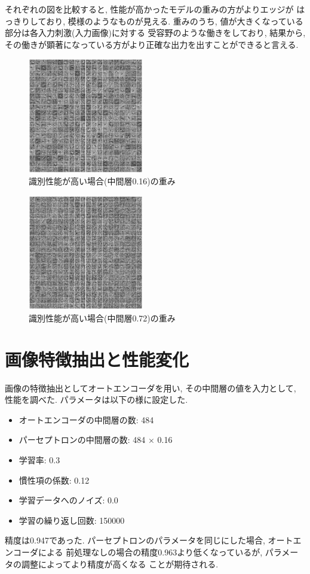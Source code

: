 \documentclass[10pt,a4paper,twocolumn]{jarticle}
\begin{document}
それぞれの図を比較すると, 性能が高かったモデルの重みの方がよりエッジが
はっきりしており, 模様のようなものが見える. 
重みのうち, 値が大きくなっている部分は各入力刺激(入力画像)に対する
受容野のような働きをしており, 結果から, 
その働きが顕著になっている方がより正確な出力を出すことができると言える. 
\begin{figure}[htbp] 
  \centering
  \includegraphics[width=0.45\textwidth]{assets/img/n_hidden_test_mnist_image_nsmpl150000_nh0.16.eps}
  \caption{識別性能が高い場合(中間層0.16)の重み}
  \label{fig:hidden-layer-analyze-img-0.16}
\end{figure}
\begin{figure}[htbp] 
  \centering
  \includegraphics[width=0.45\textwidth]{assets/img/n_hidden_test_mnist_image_nsmpl150000_nh0.72.eps}
  \caption{識別性能が高い場合(中間層0.72)の重み}
  \label{fig:hidden-layer-analyze-img-0.72}
\end{figure}
\section{画像特徴抽出と性能変化}\label{section:feature_test}
画像の特徴抽出としてオートエンコーダを用い, その中間層の値を入力として, 
性能を調べた. パラメータは以下の様に設定した. 
\begin{itemize}
  \item オートエンコーダの中間層の数: 484
  \item パーセプトロンの中間層の数: 484 × 0.16
  \item 学習率: 0.3
  \item 慣性項の係数: 0.12
  \item 学習データへのノイズ: 0.0
  \item 学習の繰り返し回数: 150000
\end{itemize}
精度は0.947であった. パーセプトロンのパラメータを同じにした場合, オートエンコーダによる
前処理なしの場合の精度0.963より低くなっているが, パラメータの調整によってより精度が高くなる
ことが期待される. 
\end{document}
